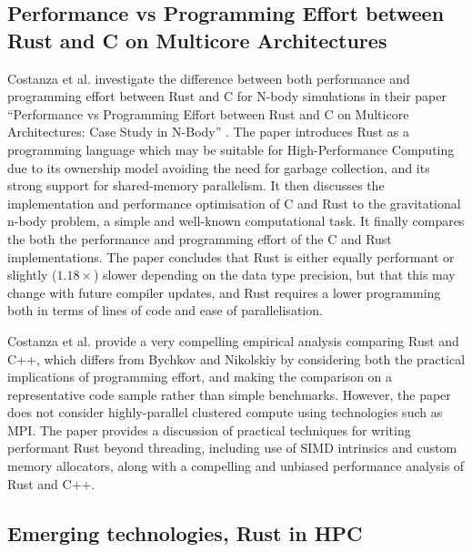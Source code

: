 

\subsection{Performance vs Programming Effort between Rust and C on Multicore Architectures}
\label{ssec:costanza-et-al}

Costanza et al. investigate the difference between both performance and programming effort between Rust and C for N-body simulations in their paper ``Performance vs Programming Effort between Rust and C on Multicore Architectures: Case Study in N-Body'' \cite{costanzoPerformanceVsProgramming2021}. The paper introduces Rust as a programming language which may be suitable for High-Performance Computing due to its ownership model avoiding the need for garbage collection, and its strong support for shared-memory parallelism. It then discusses the implementation and performance optimisation of C and Rust to the gravitational n-body problem, a simple and well-known computational task. It finally compares the both the performance and programming effort of the C and Rust implementations. The paper concludes that Rust is either equally performant or slightly ($1.18\times$) slower depending on the data type precision, but that this may change with future compiler updates, and Rust requires a lower programming both in terms of lines of code and ease of parallelisation.

Costanza et al. provide a very compelling empirical analysis comparing Rust and C++, which differs from Bychkov and Nikolskiy by considering both the practical implications of programming effort, and making the comparison on a representative code sample rather than simple benchmarks. However, the paper does not consider highly-parallel clustered compute using technologies such as MPI. The paper provides a discussion of practical techniques for writing performant Rust beyond threading, including use of SIMD intrinsics and custom memory allocators, along with a compelling and unbiased performance analysis of Rust and C++.


\subsection{Emerging technologies, Rust in HPC}
\label{ssec:moran-bull}

